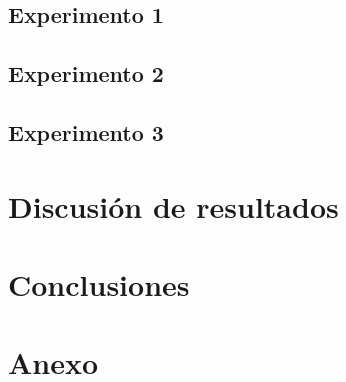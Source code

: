 \documentclass[letterpaper, 12pt, titlepage]{article}
\begin{document}
\subsection{Experimento 1}
\subsection{Experimento 2}
\subsection{Experimento 3}
\section{Discusión de resultados}
\section{Conclusiones}


\section{Anexo}
\end{document}
